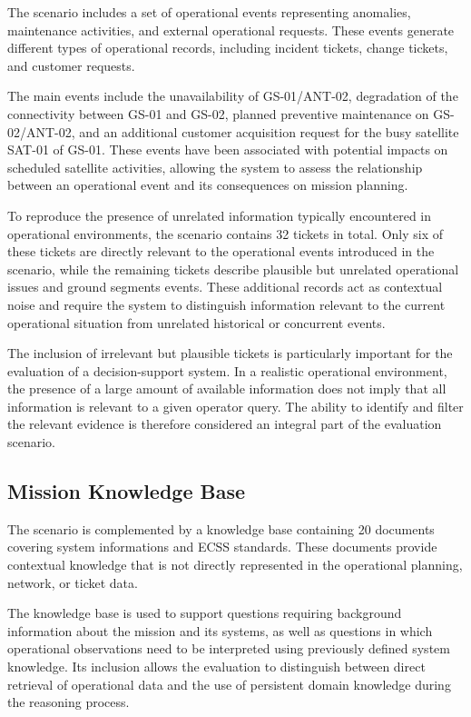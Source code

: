 The scenario includes a set of operational events representing anomalies, maintenance activities, and external operational requests. These events generate different types of operational records, including incident tickets, change tickets, and customer requests.

The main events include the unavailability of GS-01/ANT-02, degradation of the connectivity between GS-01 and GS-02, planned preventive maintenance on GS-02/ANT-02, and an additional customer acquisition request for the busy satellite SAT-01 of GS-01. These events have been associated with potential impacts on scheduled satellite activities, allowing the system to assess the relationship between an operational event and its consequences on mission planning.

To reproduce the presence of unrelated information typically encountered in operational environments, the scenario contains 32 tickets in total. Only six of these tickets are directly relevant to the operational events introduced in the scenario, while the remaining tickets describe plausible but unrelated operational issues and ground segments events. These additional records act as contextual noise and require the system to distinguish information relevant to the current operational situation from unrelated historical or concurrent events.

The inclusion of irrelevant but plausible tickets is particularly important for the evaluation of a decision-support system. In a realistic operational environment, the presence of a large amount of available information does not imply that all information is relevant to a given operator query. The ability to identify and filter the relevant evidence is therefore considered an integral part of the evaluation scenario.

\subsection{Mission Knowledge Base}

The scenario is complemented by a knowledge base containing 20 documents covering system informations and ECSS standards. These documents provide contextual knowledge that is not directly represented in the operational planning, network, or ticket data.

The knowledge base is used to support questions requiring background information about the mission and its systems, as well as questions in which operational observations need to be interpreted using previously defined system knowledge. Its inclusion allows the evaluation to distinguish between direct retrieval of operational data and the use of persistent domain knowledge during the reasoning process.


